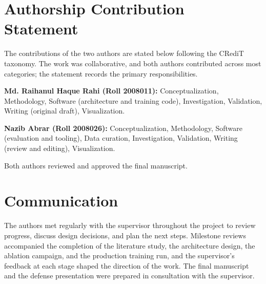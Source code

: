 \section{Authorship Contribution Statement}
The contributions of the two authors are stated below following the CRediT
taxonomy. The work was collaborative, and both authors contributed across
most categories; the statement records the primary responsibilities.

\vspace{0.5em}
\noindent\textbf{Md. Raihanul Haque Rahi (Roll 2008011):}
Conceptualization, Methodology, Software (architecture and training code),
Investigation, Validation, Writing (original draft), Visualization.

\vspace{0.4em}
\noindent\textbf{Nazib Abrar (Roll 2008026):}
Conceptualization, Methodology, Software (evaluation and tooling), Data
curation, Investigation, Validation, Writing (review and editing),
Visualization.

\vspace{0.4em}
\noindent Both authors reviewed and approved the final manuscript.

\section{Communication}
The authors met regularly with the supervisor throughout the project to
review progress, discuss design decisions, and plan the next steps.
Milestone reviews accompanied the completion of the literature study, the
architecture design, the ablation campaign, and the production training
run, and the supervisor's feedback at each stage shaped the direction of
the work. The final manuscript and the defense presentation were prepared
in consultation with the supervisor.
